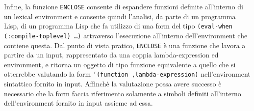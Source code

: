 Infine, la funzione \texttt{ENCLOSE} consente di espandere funzioni definite
all’interno di un lexical environment e consente quindi l’analisi, da parte di
un programma Lisp, di un programma Lisp che fa utilizzo di una form del tipo
\texttt{(eval-when (:compile-toplevel) …)} attraverso l’esecuzione all’interno
dell’environment che contiene questa. Dal punto di vista pratico,
\texttt{ENCLOSE} è una funzione che lavora a partire da un input,
rappresentato da una coppia lambda-expression ed environment, e ritorna un
oggetto di tipo funzione equivalente a quello che si otterrebbe valutando la
form \texttt{`(function ,lambda-expression)} nell'environment sintattico
fornito in input. Affinchè la valutazione possa avere successo è necessario
che la form faccia riferimento solamente a simboli definiti all'interno
dell'environment fornito in input assieme ad essa.
